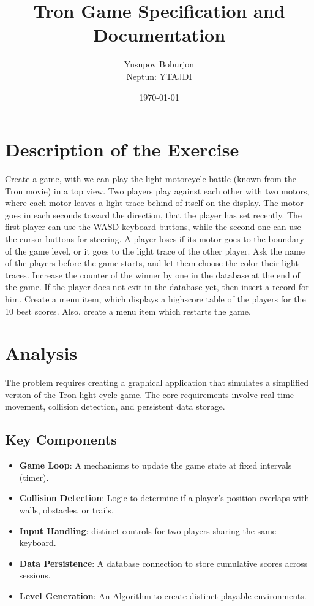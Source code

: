 \documentclass[12pt,a4paper]{article}
\title{\textbf{Tron Game Specification and Documentation}}
\author{Yusupov Boburjon\\Neptun: YTAJDI}
\date{\today}
\begin{document}
\maketitle

\newpage

\section{Description of the Exercise}

Create a game, with we can play the light-motorcycle battle (known from the Tron movie) in a top view. Two players play against each other with two motors, where each motor leaves a light trace behind of itself on the display. The motor goes in each seconds toward the direction, that the player has set recently. The first player can use the WASD keyboard buttons, while the second one can use the cursor buttons for steering. A player loses if its motor goes to the boundary of the game level, or it goes to the light trace of the other player. Ask the name of the players before the game starts, and let them choose the color their light traces. Increase the counter of the winner by one in the database at the end of the game. If the player does not exit in the database yet, then insert a record for him. Create a menu item, which displays a highscore table of the players for the 10 best scores. Also, create a menu item which restarts the game.

\section{Analysis}

The problem requires creating a graphical application that simulates a simplified version of the Tron light cycle game. The core requirements involve real-time movement, collision detection, and persistent data storage.

\subsection{Key Components}
\begin{itemize}
    \item \textbf{Game Loop}: A mechanisms to update the game state at fixed intervals (timer).
    \item \textbf{Collision Detection}: Logic to determine if a player's position overlaps with walls, obstacles, or trails.
    \item \textbf{Input Handling}: distinct controls for two players sharing the same keyboard.
    \item \textbf{Data Persistence}: A database connection to store cumulative scores across sessions.
    \item \textbf{Level Generation}: An Algorithm to create distinct playable environments.
\end{itemize}
\end{document}
